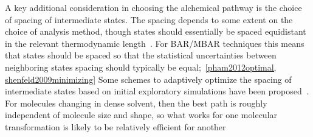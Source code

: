 \documentclass[9pt,bestpractices]{livecoms}
\begin{document}
A key additional consideration in choosing the alchemical pathway is the choice of spacing of intermediate states.
The spacing depends to some extent on the choice of analysis method, though states should essentially be spaced equidistant in the relevant thermodynamic length~\cite{crooks2007measuringa, sivak2012thermodynamic}.
For BAR/MBAR techniques this means that states should be spaced so that the statistical uncertainties between neighboring states spacing should typically be equal;~\ref{pham2012optimal, shenfeld2009minimizing}
Some schemes to adaptively optimize the spacing of intermediate states based on initial exploratory simulations have been proposed~\cite{hayes2017adaptive}. For molecules changing in dense solvent, then the best path is roughly independent of molecule size and shape, so what works for one molecular transformation is likely to be relatively efficient for another~\cite{monroe2004converging}
\end{document}

